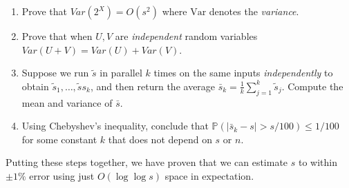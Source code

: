 \documentclass[11pt]{article}
\theoremstyle{definition}
\begin{document}
\begin{enumerate}[leftmargin=0pt, itemsep=3ex]
\begin{enumerate}[leftmargin=\parindent, itemsep=1ex]
    \item Prove that $\mathit{Var}(2^X) = O(s^2)$ where $\mathrm{Var}$ denotes the \emph{variance}.
    
    \item Prove that when $U,V$ are \emph{independent} random variables $\mathit{Var}(U + V) = \mathit{Var}(U) + \mathit{Var}(V)$.
    
    \item Suppose we run $\tilde{s}$ in parallel $k$ times on the same inputs \emph{independently} to obtain $\tilde{s}_{1},\dots,\tilde{s}s_{k}$, and then return the average $\bar{s}_{k} = \frac{1}{k} \sum_{j=1}^{k} \tilde{s}_{j}$.  Compute the mean and variance of $\bar{s}$.
    
    \item Using Chebyshev's inequality, conclude that $\mathbb{P}(|\bar{s}_{k} - s| > s/100) \leq 1/100$ for some constant $k$ that does not depend on $s$ or $n$.
\end{enumerate}
Putting these steps together, we have proven that we can estimate $s$ to within $\pm 1\%$ error using just $O(\log \log s)$ space in expectation.
\end{enumerate}
\end{document}
